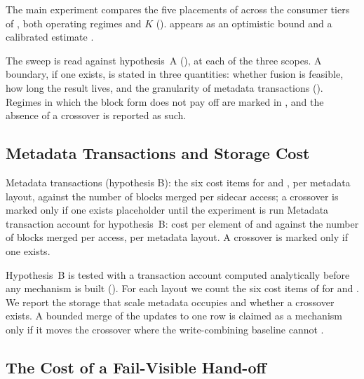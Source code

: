 %
The main experiment compares the five placements of  across the consumer tiers of , both operating regimes and $K$ ().
\armSE appears as an optimistic bound and a calibrated estimate .

%
The sweep is read against hypothesis~A (), at each of the three scopes.
A boundary, if one exists, is stated in three quantities: whether fusion is feasible, how long the result lives, and the granularity of metadata transactions ().
Regimes in which the block form does not pay off are marked in , and the absence of a crossover is reported as such.

\subsection{Metadata Transactions and Storage Cost}\label{sec:res-metadata}

%
  {Metadata transactions (hypothesis B): the six cost items for \armBM and \armSM, per metadata layout, against the number of blocks merged per sidecar access; a crossover is marked only if one exists}%
  {placeholder until the experiment is run}%
  {Metadata transaction account for hypothesis~B: cost per element of \armBM and \armSM against the number of blocks merged per \sidecar access, per metadata layout. A crossover is marked only if one exists.}

%
Hypothesis~B is tested with a transaction account computed analytically before any mechanism is built ().
For each \sidecar layout we count the six cost items of  for \armBM and \armSM.
We report the storage that scale metadata occupies and whether a crossover exists.
A bounded merge of the updates to one \sidecar row is claimed as a mechanism only if it moves the crossover where the write-combining baseline cannot .

\subsection{The Cost of a Fail-Visible Hand-off}\label{sec:res-failvis}

